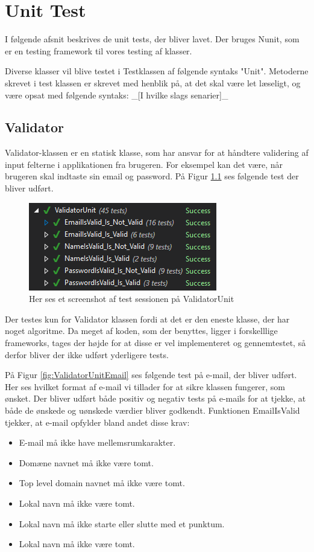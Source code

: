 \chapter{Unit Test}
I følgende afsnit beskrives de unit tests,  der bliver lavet. Der bruges Nunit\cite{NUnit}, som er en testing framework til vores testing af klasser. 

Diverse klasser vil blive testet i Testklassen af følgende syntaks "Unit". Metoderne skrevet i test klassen er skrevet med henblik på, at det skal være let læseligt, og være opsat med følgende syntaks: 
\_[I hvilke slags senarier]\_ 

\section{Validator}
Validator-klassen er en statisk klasse, som har ansvar for at håndtere validering af input felterne i applikationen fra brugeren. For eksempel kan det være, når brugeren skal indtaste sin email og password. På Figur \ref{fig:ValidatorUnit} ses følgende test der bliver udført.
\begin{figure}[H]
	\centering
	\includegraphics[width=0.6\linewidth]{Unit/ValidatorUnit.PNG}
	\caption{Her ses et screenshot af test sessionen på ValidatorUnit}
	\label{fig:ValidatorUnit}
\end{figure}
 Der testes kun for Validator klassen fordi at det er den eneste klasse, der har noget algoritme. Da meget af koden, som der benyttes, ligger i forskelllige frameworks, tages der højde for at disse er vel implementeret og gennemtestet, så derfor bliver der ikke udført yderligere tests. 
\clearpage

På Figur \ref{fig:ValidatorUnitEmail} ses følgende test på e-mail, der bliver udført. Her ses hvilket format af e-mail vi tillader for at sikre klassen fungerer, som ønsket.
Der bliver udført både positiv og negativ tests på e-mails for at tjekke, at både de ønskede og uønskede værdier bliver godkendt. Funktionen EmailIsValid tjekker, at e-mail opfylder bland andet disse krav:\\
\begin{itemize}
	\item E-mail må ikke have mellemsrumkarakter.
	\item Domæne navnet må ikke være tomt.
	\item Top level domain navnet\cite{TLD} må ikke være tomt.
	\item Lokal navn må ikke være tomt.
	\item Lokal navn må ikke starte eller slutte med et punktum.
	\item Lokal navn må ikke være tomt.
	
\end{itemize}

